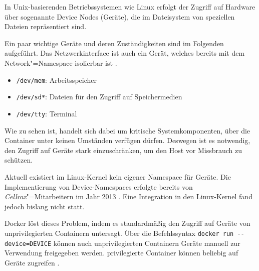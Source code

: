 \documentclass[../main.tex]{subfiles}
\begin{document}
			In Unix-basierenden Betriebssystemen wie Linux erfolgt der Zugriff auf Hardware über sogenannte Device Nodes (Geräte), die im Dateisystem von speziellen Dateien repräsentiert sind.

			Ein paar wichtige Geräte und deren Zuständigkeiten sind im Folgenden aufgeführt. Das Netzwerkinterface ist auch ein Gerät, welches bereits mit dem Network"=Namespace isolierbar ist \cite{deviceNs}.

			\begin{itemize}
				\item \texttt{/dev/mem}: Arbeitsspeicher
				\item \texttt{/dev/sd*}: Dateien für den Zugriff auf Speichermedien
				\item \texttt{/dev/tty}: Terminal
			\end{itemize}

			Wie zu sehen ist, handelt sich dabei um kritische Systemkomponenten, über die Container unter keinen Umständen verfügen dürfen. Deswegen ist es notwendig, den Zugriff auf Geräte stark einzuschränken, um den Host vor Missbrauch zu schützen.

			Aktuell existiert im Linux-Kernel kein eigener Namespace für Geräte. Die Implementierung von Device-Namespaces erfolgte bereits von \emph{Cellrox}"=Mitarbeitern im Jahr 2013 \cite{deviceNsCerrox}. Eine Integration in den Linux-Kernel fand jedoch bislang nicht statt.

			Docker löst dieses Problem, indem es standardmäßig den Zugriff auf Geräte von unprivilegierten Containern untersagt. Über die Befehlssyntax \texttt{docker run -{}-device=DEVICE} können auch unprivilegierten Containern Geräte manuell zur Verwendung freigegeben werden. privilegierte Container können beliebig auf Geräte zugreifen \cite{dockerRun}.





\end{document}
